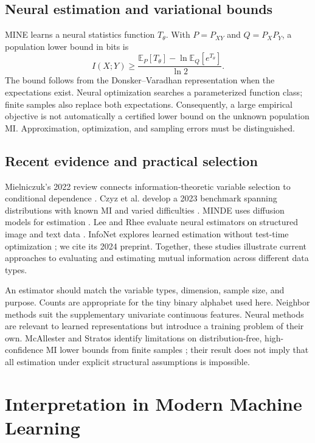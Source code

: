 \documentclass[journal,11pt]{IEEEtran}
\begin{document}
\subsection{Neural estimation and variational bounds}
MINE \cite{mine} learns a neural statistics function $T_\theta$. With $P=P_{XY}$ and $Q=P_XP_Y$, a population lower bound in bits is
\begin{equation}
I(X;Y)\geq\frac{\mathbb E_P[T_\theta]-\ln\mathbb E_Q[e^{T_\theta}]}{\ln 2}.
\end{equation}
The bound follows from the Donsker--Varadhan representation when the expectations exist. Neural optimization searches a parameterized function class; finite samples also replace both expectations. Consequently, a large empirical objective is not automatically a certified lower bound on the unknown population MI. Approximation, optimization, and sampling errors must be distinguished.

\subsection{Recent evidence and practical selection}
Mielniczuk's 2022 review connects information-theoretic variable selection to conditional dependence \cite{review}. Czyz et al. develop a 2023 benchmark spanning distributions with known MI and varied difficulties \cite{beyond}. MINDE uses diffusion models for estimation \cite{minde}. Lee and Rhee evaluate neural estimators on structured image and text data \cite{benchmark}. InfoNet explores learned estimation without test-time optimization \cite{infonet}; we cite its 2024 preprint. Together, these studies illustrate current approaches to evaluating and estimating mutual information across different data types.

An estimator should match the variable types, dimension, sample size, and purpose. Counts are appropriate for the tiny binary alphabet used here. Neighbor methods suit the supplementary univariate continuous features. Neural methods are relevant to learned representations but introduce a training problem of their own. McAllester and Stratos identify limitations on distribution-free, high-confidence MI lower bounds from finite samples \cite{limits}; their result does not imply that all estimation under explicit structural assumptions is impossible.

\section{Interpretation in Modern Machine Learning}
\end{document}
